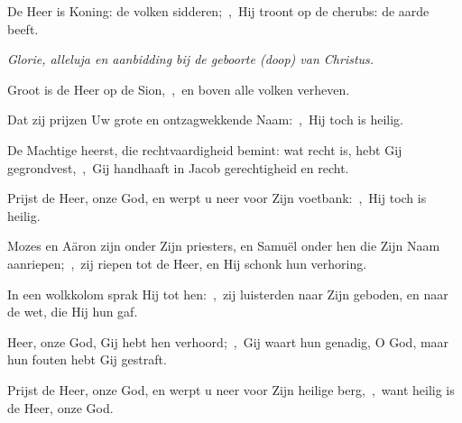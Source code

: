 \documentclass[12pt,twoside,a5paper]{article}
\begin{document}


\begin{halfparskip}

  De Heer is Koning: de volken sidderen;~\sep\ Hij troont op de cherubs: de aarde beeft.


  \liturgicallbracket{} \emph{Glorie, alleluja en aanbidding bij de geboorte (doop) van Christus.}\liturgicalrbracket

  Groot is de Heer op de Sion,~\sep\ en boven alle volken verheven.

  Dat zij prijzen Uw grote en ontzagwekkende Naam:~\sep\ Hij toch is heilig.

  De Machtige heerst, die rechtvaardigheid bemint: wat recht is, hebt Gij gegrondvest,~\sep\ Gij handhaaft in Jacob gerechtigheid en recht.

  Prijst de Heer, onze God, en werpt u neer voor Zijn voetbank:~\sep\ Hij toch is heilig.
\end{halfparskip}

\begin{halfparskip}

  Mozes en Aäron zijn onder Zijn priesters, en Samuël onder hen die Zijn Naam aanriepen;~\sep\ zij riepen tot de Heer, en Hij schonk hun verhoring.

  In een wolkkolom sprak Hij tot hen:~\sep\ zij luisterden naar Zijn geboden, en naar de wet, die Hij hun gaf.

  Heer, onze God, Gij hebt hen verhoord;~\sep\ Gij waart hun genadig, O God, maar hun fouten hebt Gij gestraft.

  Prijst de Heer, onze God, en werpt u neer voor Zijn heilige berg,~\sep\ want heilig is de Heer, onze God.
\end{halfparskip}

\end{document}
